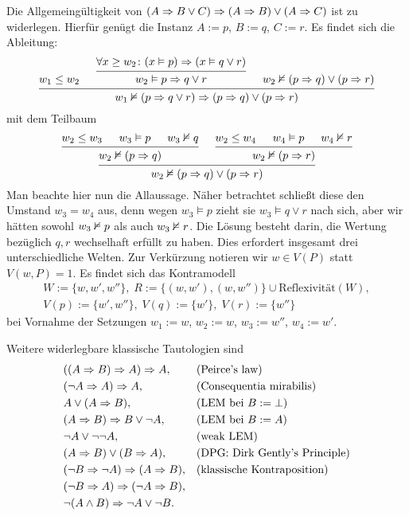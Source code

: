 Die Allgemeingültigkeit von $(A\Rightarrow B\lor C)\Rightarrow (A\Rightarrow B)\lor (A\Rightarrow C)$
ist zu widerlegen. Hierfür genügt die Instanz $A:=p$, $B:=q$, $C:=r$.
Es findet sich die Ableitung:
\[\begin{prooftree}
  \hypo{w_1\le w_2}
    \hypo{\forall x\ge w_2\colon (x\models p)\Rightarrow (x\models q\lor r)}
  \infer1{w_2\models p\cond q\lor r}
  \hypo{w_2\refutes (p\cond q)\lor (p\cond r)}
\infer3{w_1\refutes (p\cond q\lor r)\cond (p\cond q)\lor (p\cond r)}
\end{prooftree}\]
mit dem Teilbaum
\[\begin{prooftree}
    \hypo{w_2\le w_3}
    \hypo{w_3\models p}
    \hypo{w_3\refutes q}
  \infer3{w_2\refutes (p\cond q)}
    \hypo{w_2\le w_4}
    \hypo{w_4\models p}
    \hypo{w_4\refutes r}
  \infer3{w_2\refutes (p\cond r)}
\infer2{w_2\refutes (p\cond q)\lor (p\cond r)}
\end{prooftree}\]
Man beachte hier nun die Allaussage. Näher betrachtet schließt diese
den Umstand $w_3=w_4$ aus, denn wegen $w_3\models p$ zieht sie
$w_3\models q\lor r$ nach sich, aber wir hätten sowohl $w_3\nvDash p$
als auch $w_3\nvDash r$. Die Lösung besteht darin, die Wertung
bezüglich $q,r$ wechselhaft erfüllt zu haben. Dies erfordert insgesamt
drei unterschiedliche Welten. Zur Verkürzung notieren wir $w\in V(P)$
statt $V(w,P)=1$. Es findet sich das Kontramodell
\begin{gather*}
W:=\{w,w',w''\},\; R := \{(w,w'),(w,w'')\}\cup\text{Reflexivität}(W),\\
V(p):=\{w',w''\},\; V(q):=\{w'\},\; V(r):=\{w''\}
\end{gather*}
bei Vornahme der Setzungen $w_1:=w$, $w_2:=w$, $w_3:=w''$, $w_4:=w'$.

Weitere widerlegbare klassische Tautologien sind
\begin{align*}
& ((A\Rightarrow B)\Rightarrow A)\Rightarrow A, && \text{(Peirce's law)}\\
& (\lnot A\Rightarrow A)\Rightarrow A, && \text{(Consequentia mirabilis)}\\
& A\lor (A\Rightarrow B), && \text{(LEM bei $B:=\bot$)}\\
& (A\Rightarrow B)\Rightarrow B\lor\lnot A, && \text{(LEM bei $B:=A$)}\\
& \lnot A\lor\lnot\lnot A, && \text{(weak LEM)}\\
& (A\Rightarrow B)\lor (B\Rightarrow A), && \text{(DPG: Dirk Gently's Principle)}\\
& (\lnot B\Rightarrow\lnot A)\Rightarrow (A\Rightarrow B), && \text{(klassische Kontraposition)}\\
& (\lnot B\Rightarrow A)\Rightarrow (\lnot A\Rightarrow B),\\
& \lnot (A\land B)\Rightarrow\lnot A\lor\lnot B.
\end{align*}

